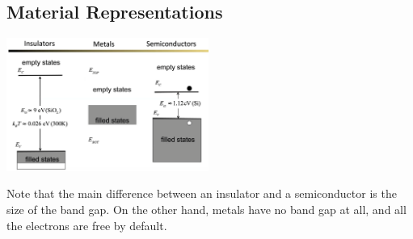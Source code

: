\documentclass[nobib]{tufte-handout}
\begin{document}
\subsection*{Material Representations}
\begin{center}
    \includegraphics*[width = 250px]{images/material_representations.png}
\end{center}
Note that the main difference between an insulator and a semiconductor is the size of the band gap. On the other hand, metals have no band gap at all, and all the electrons are free by default.
\end{document}
